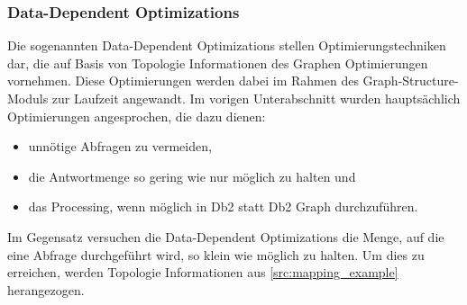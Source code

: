 \subsubsection{Data-Dependent Optimizations}
\label{subsubsec:data_dependent_optimizations}

Die sogenannten Data-Dependent Optimizations stellen Optimierungstechniken dar, die auf Basis von Topologie Informationen des Graphen Optimierungen vornehmen. Diese Optimierungen werden dabei im Rahmen des Graph-Structure-Moduls zur Laufzeit angewandt. Im vorigen Unterabschnitt  wurden hauptsächlich Optimierungen angesprochen, die dazu dienen:
\begin{itemize}
    \item unnötige Abfragen zu vermeiden, 
    \item die Antwortmenge so gering wie nur möglich zu halten und 
    \item das Processing, wenn möglich in Db2 statt Db2 Graph durchzuführen.  
\end{itemize}
Im Gegensatz versuchen die Data-Dependent Optimizations die Menge, auf die eine Abfrage durchgeführt wird, so klein wie möglich zu halten. Um dies zu erreichen, werden Topologie Informationen aus \autoref{src:mapping_example} herangezogen.

